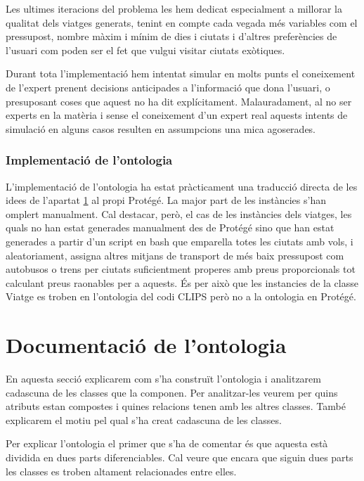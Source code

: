 \documentclass[11pt,a4paper]{article}
\begin{document}
Les ultimes iteracions del problema les hem dedicat especialment a millorar la qualitat dels viatges generats, tenint en compte cada vegada més variables com el pressupost, nombre màxim i mínim de dies i ciutats i d'altres preferències de l'usuari com poden ser el fet que vulgui visitar ciutats exòtiques.

Durant tota l'implementació hem intentat simular en molts punts el coneixement de l'expert prenent decisions anticipades a l'informació que dona l'usuari, o presuposant coses que aquest no ha dit explícitament. Malauradament, al no ser experts en la matèria i sense el coneixement d'un expert real aquests intents de simulació en alguns casos resulten en assumpcions una mica agoserades.


\subsubsection{Implementació de l'ontologia}
L'implementació de l'ontologia ha estat pràcticament una traducció directa de les idees de l'apartat \ref{sec:ontologia} al propi Protégé. La major part de les instàncies s'han omplert manualment. Cal destacar, però, el cas de les instàncies dels viatges, les quals no han estat generades manualment des de Protégé sino que han estat generades a partir d'un script en bash que emparella totes les ciutats amb vols, i aleatoriament, assigna altres mitjans de transport de més baix pressupost com autobusos o trens per ciutats suficientment properes amb preus proporcionals tot calculant preus raonables per a aquests. És per això que les instancies de la classe Viatge es troben en l'ontologia del codi CLIPS però no a la ontologia en Protégé.


\clearpage


\section{Documentació de l'ontologia}%
\label{sec:ontologia}
En aquesta secció explicarem com s'ha construït l'ontologia i analitzarem cadascuna de les classes que la componen. Per analitzar-les veurem per quins atributs estan compostes i quines relacions tenen amb les altres classes. També explicarem el motiu pel qual s'ha creat cadascuna de les classes.

Per explicar l'ontologia el primer que s'ha de comentar és que aquesta està dividida en dues parts diferenciables. Cal veure que encara que siguin dues parts les classes es troben altament relacionades entre elles.
\end{document}
